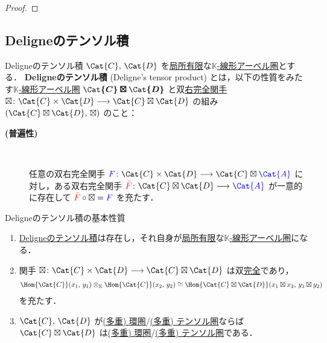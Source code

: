 \documentclass[TQFT_main]{subfiles}
\begin{document}
\begin{proof}
    
\end{proof}


\subsection{Deligneのテンソル積}

\begin{mydef}[label=def:DeligneProduct]{Deligneのテンソル積}
    $\Cat{C},\, \Cat{D}$ を\hyperref[def:finite-abcat]{局所有限}な\hyperref[def:additive-cat]{$\mathbb{K}$-線形アーベル圏}とする．
    \textbf{Deligneのテンソル積} (Deligne's tensor product) とは，以下の性質をみたす\hyperref[def:additive-cat]{$\mathbb{K}$-線形アーベル圏} $\bm{\Cat{C} \boxtimes \Cat{D}}$ と双\hyperref[def:additive-exact]{右完全関手} $\boxtimes \colon \Cat{C} \times \Cat{D} \lto \Cat{C} \boxtimes \Cat{D}$ の組み $(\Cat{C} \boxtimes \Cat{D},\, \boxtimes)$ のこと：
    \begin{description}
        \item[\textbf{(普遍性)}]　
        
        任意の双右完全関手 $\textcolor{blue}{F} \colon \Cat{C} \times \Cat{D} \lto \Cat{C} \boxtimes \textcolor{blue}{\Cat{A}}$ に対し，ある双右完全関手 $\textcolor{red}{\bar{F}} \colon \Cat{C} \boxtimes \Cat{D} \lto \textcolor{blue}{\Cat{A}}$ が一意的に存在して $\textcolor{red}{\bar{F}} \circ \boxtimes = \textcolor{blue}{F}$ を充たす．
    \end{description}
    
\end{mydef}

\begin{myprop}[label=prop:DeligneProduct]{Deligneのテンソル積の基本性質}
    \begin{enumerate}
        \item \hyperref[def:DeligneProduct]{Deligneのテンソル積}は存在し，それ自身が\hyperref[def:finite-abcat]{局所有限}な\hyperref[def:additive-cat]{$\mathbb{K}$-線形アーベル圏}になる．
        \item 関手 $\boxtimes \colon \Cat{C} \times \Cat{D} \lto \Cat{C} \boxtimes \Cat{D}$ は双\hyperref[def:additive-exact]{完全}であり，
        \begin{align}
            \Hom{\Cat{C}} (x_1,\, y_1) \otimes_{\mathbb{K}} \Hom{\Cat{C}} (x_2,\, y_2) \cong \Hom{\Cat{C} \boxtimes \Cat{D}} (x_1 \boxtimes x_2,\, y_1 \boxtimes y_2)
        \end{align}
        を充たす．
        \item $\Cat{C},\, \Cat{D}$ が\hyperref[def:ringcat]{(多重) 環圏}/\hyperref[def:tensorfusion-cat]{(多重) テンソル圏}ならば $\Cat{C} \boxtimes \Cat{D}$ は\hyperref[def:ringcat]{(多重) 環圏}/\hyperref[def:tensorfusion-cat]{(多重) テンソル圏}である．
    \end{enumerate}
    
\end{myprop}
\end{document}
